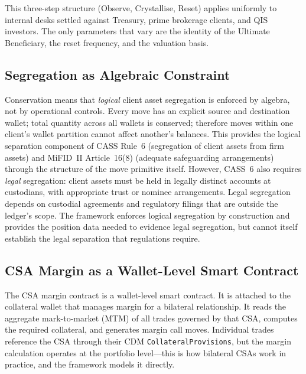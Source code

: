 \documentclass[11pt,a4paper]{article}
\begin{document}
This three-step structure (Observe, Crystallise, Reset) applies uniformly to internal desks settled against Treasury, prime brokerage clients, and QIS investors. The only parameters that vary are the identity of the Ultimate Beneficiary, the reset frequency, and the valuation basis.

\subsection{Segregation as Algebraic Constraint}

Conservation means that \emph{logical} client asset segregation is enforced by algebra, not by operational controls. Every move has an explicit source and destination wallet; total quantity across all wallets is conserved; therefore moves within one client's wallet partition cannot affect another's balances. This provides the logical separation component of CASS Rule~6 (segregation of client assets from firm assets) and MiFID~II Article~16(8) (adequate safeguarding arrangements) through the structure of the move primitive itself. However, CASS~6 also requires \emph{legal} segregation: client assets must be held in legally distinct accounts at custodians, with appropriate trust or nominee arrangements. Legal segregation depends on custodial agreements and regulatory filings that are outside the ledger's scope. The framework enforces logical segregation by construction and provides the position data needed to evidence legal segregation, but cannot itself establish the legal separation that regulations require.

\subsection{CSA Margin as a Wallet-Level Smart Contract}

The CSA margin contract is a wallet-level smart contract. It is attached to the collateral wallet that manages margin for a bilateral relationship. It reads the aggregate mark-to-market (MTM) of all trades governed by that CSA, computes the required collateral, and generates margin call moves. Individual trades reference the CSA through their CDM \texttt{CollateralProvisions}, but the margin calculation operates at the portfolio level---this is how bilateral CSAs work in practice, and the framework models it directly.
\end{document}
